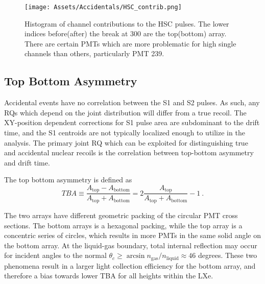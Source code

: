 \begin{figure}
    \centering
    \texttt{[image: Assets/Accidentals/HSC\_contrib.png]}
    \caption[Histogram of channel contributions to the HSC pulses. 
    The lower indices before(after) the break at 300 are the top(bottom) array.]%
    {Histogram of channel contributions to the HSC pulses. 
    The lower indices before(after) the break at 300 are the top(bottom) array.
    There are certain PMTs which are more problematic for high single channels than others, particularly PMT 239.}
    \label{fig:hsc_contrib}
\end{figure}

\subsection{Top Bottom Asymmetry}
\label{sec:tba_cut}
Accidental events have no correlation between the S1 and S2 pulses.
As such, any RQs which depend on the joint distribution will differ from a true  recoil.
The XY-position dependent corrections for S1 pulse area are subdominant to the drift time, and the S1 centroids are not typically localized enough to utilize in the analysis.
The primary joint RQ which can be exploited for distinguishing true and accidental nuclear recoils is the correlation between top-bottom asymmetry and drift time.

The top bottom asymmetry is defined as 
\begin{equation}
    TBA \equiv \frac{A_{\text{top}} - A_{\text{bottom}}}{A_{\text{top}} + A_{\text{bottom}}} = 2 \frac{A_{\text{top}}}{A_{\text{top}}+A_{\text{bottom}}} -1~.
\end{equation}

The two arrays have different geometric packing of the circular PMT cross sections.
The bottom arrays is a hexagonal packing, while the top array is a concentric series of circles, which results in more PMTs in the same solid angle on the bottom array.
At the liquid-gas boundary, total internal reflection may occur for incident angles to the normal $ \theta_c \geq \arcsin n_{\text{gas}}/n_{\text{liquid}} \approx 46$ degrees.
These two phenomena result in a larger light collection efficiency for the bottom array, and therefore a bias towards lower TBA for all heights within the LXe.

